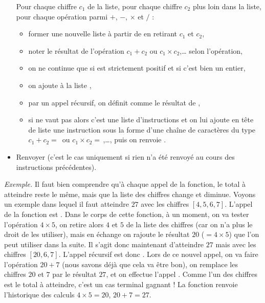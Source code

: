 \documentclass[11pt,class=report,crop=false]{standalone}
\begin{document}
\begin{activite}
\begin{algorithme}
\begin{itemize}
   Pour chaque chiffre $c_1$ de la liste, pour chaque chiffre $c_2$ plus loin dans la liste, pour chaque opération parmi  \og{}$+$\fg{}, \og{}$-$\fg{}, \og{}$\times$\fg{} et \og{}$/$\fg{} :
   
    \begin{itemize}
      \item former une nouvelle liste  à partir de  en retirant $c_1$ et $c_2$,
      \item noter  le résultat de l'opération $c_1 + c_2$ ou $c_1\times c_2$,\ldots{} selon l'opération,
      \item on ne continue que si  est strictement positif et si c'est bien un entier,
      \item on ajoute  à la liste ,
      
      \item  par un appel récursif, on définit  comme le résultat de 
      ,     
      \item si  ne vaut pas  alors c'est une liste d'instructions et on lui ajoute en tête de liste une instruction sous la forme d'une chaîne de caractères du type \og{}$c_1 + c_2 = $\,\fg{} ou \og{}$c_1 \times c_2 = $\,\fg{},\ldots, puis on renvoie .
    \end{itemize}
    
    \item Renvoyer  (c'est le cas uniquement si rien n'a été renvoyé au cours des instructions précédentes). 
  \end{itemize}
 \end{algorithme} 
 
\bigskip
\emph{Exemple.}
Il faut bien comprendre qu'à chaque appel de la fonction, le total à atteindre reste le même, mais que la liste des chiffres change et diminue.
Voyons un exemple dans lequel il faut atteindre $27$ avec les chiffres $[4,5,6,7]$.
L'appel de la fonction est . Dans le corps de cette fonction,
à un moment, on va tester l'opération $4\times5$, on retire alors $4$ et $5$ de la liste des chiffres (car on n'a plus le droit de les utiliser), mais en échange on rajoute le résultat $20$ ($=4\times5$) que l'on peut utiliser dans la suite. Il s'agit donc maintenant d'atteindre $27$ mais avec les chiffres $[20,6,7]$. L'appel récursif est donc .
Lors de ce nouvel appel, on va faire l'opération $20+7$ (nous savons déjà que cela va être bon), on remplace les chiffres $20$ et $7$ par le résultat $27$, et on effectue l'appel . Comme l'un des chiffres est le total à atteindre, c'est un cas terminal gagnant ! La fonction renvoie l'historique des calculs \og{}$4\times 5 = 20$\fg{}, \og{}$20 + 7 = 27$\fg{}.





\end{activite}
\end{document}

